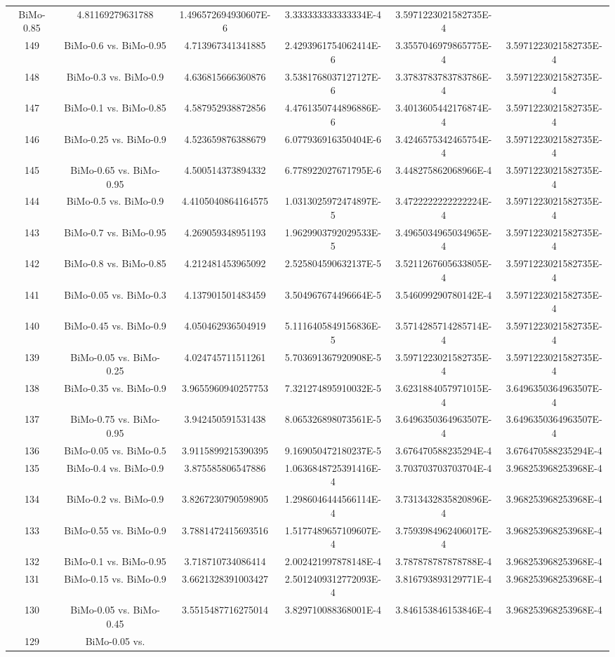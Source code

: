 \documentclass[a4paper,10pt]{article}
\begin{document}
\begin{landscape}
\begin{table}[!htp]
\begin{tabular}{cccccc}
BiMo-0.85&4.81169279631788&1.496572694930607E-6&3.333333333333334E-4&3.5971223021582735E-4\\149&BiMo-0.6 vs. BiMo-0.95&4.713967341341885&2.4293961754062414E-6&3.3557046979865775E-4&3.5971223021582735E-4\\148&BiMo-0.3 vs. BiMo-0.9&4.636815666360876&3.5381768037127127E-6&3.3783783783783786E-4&3.5971223021582735E-4\\147&BiMo-0.1 vs. BiMo-0.85&4.587952938872856&4.4761350744896886E-6&3.4013605442176874E-4&3.5971223021582735E-4\\146&BiMo-0.25 vs. BiMo-0.9&4.523659876388679&6.077936916350404E-6&3.4246575342465754E-4&3.5971223021582735E-4\\145&BiMo-0.65 vs. BiMo-0.95&4.500514373894332&6.778922027671795E-6&3.448275862068966E-4&3.5971223021582735E-4\\144&BiMo-0.5 vs. BiMo-0.9&4.4105040864164575&1.0313025972474897E-5&3.4722222222222224E-4&3.5971223021582735E-4\\143&BiMo-0.7 vs. BiMo-0.95&4.269059348951193&1.9629903792029533E-5&3.4965034965034965E-4&3.5971223021582735E-4\\142&BiMo-0.8 vs. BiMo-0.85&4.212481453965092&2.525804590632137E-5&3.5211267605633805E-4&3.5971223021582735E-4\\141&BiMo-0.05 vs. BiMo-0.3&4.137901501483459&3.504967674496664E-5&3.546099290780142E-4&3.5971223021582735E-4\\140&BiMo-0.45 vs. BiMo-0.9&4.050462936504919&5.1116405849156836E-5&3.5714285714285714E-4&3.5971223021582735E-4\\139&BiMo-0.05 vs. BiMo-0.25&4.024745711511261&5.703691367920908E-5&3.5971223021582735E-4&3.5971223021582735E-4\\138&BiMo-0.35 vs. BiMo-0.9&3.9655960940257753&7.321274895910032E-5&3.6231884057971015E-4&3.6496350364963507E-4\\137&BiMo-0.75 vs. BiMo-0.95&3.942450591531438&8.065326898073561E-5&3.6496350364963507E-4&3.6496350364963507E-4\\136&BiMo-0.05 vs. BiMo-0.5&3.9115899215390395&9.169050472180237E-5&3.676470588235294E-4&3.676470588235294E-4\\135&BiMo-0.4 vs. BiMo-0.9&3.875585806547886&1.0636848725391416E-4&3.703703703703704E-4&3.968253968253968E-4\\134&BiMo-0.2 vs. BiMo-0.9&3.8267230790598905&1.2986046444566114E-4&3.7313432835820896E-4&3.968253968253968E-4\\133&BiMo-0.55 vs. BiMo-0.9&3.7881472415693516&1.5177489657109607E-4&3.7593984962406017E-4&3.968253968253968E-4\\132&BiMo-0.1 vs. BiMo-0.95&3.718710734086414&2.002421997878148E-4&3.787878787878788E-4&3.968253968253968E-4\\131&BiMo-0.15 vs. BiMo-0.9&3.6621328391003427&2.5012409312772093E-4&3.816793893129771E-4&3.968253968253968E-4\\130&BiMo-0.05 vs. BiMo-0.45&3.5515487716275014&3.829710088368001E-4&3.846153846153846E-4&3.968253968253968E-4\\129&BiMo-0.05 vs. 
\end{tabular}
\end{table}
\end{landscape}
\end{document}
